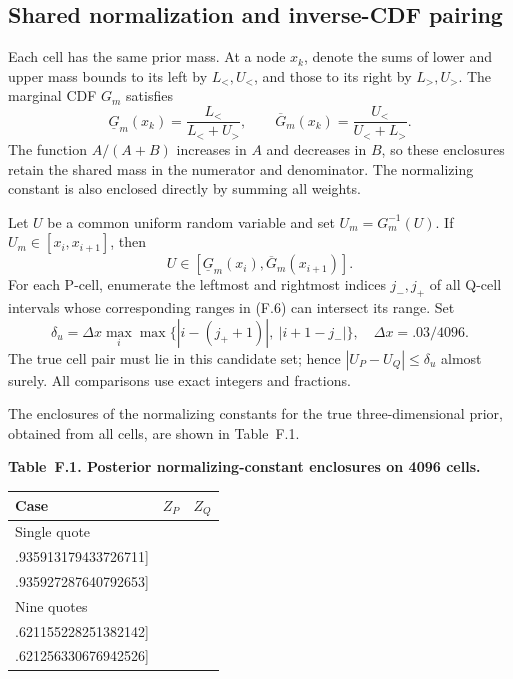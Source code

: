 \subsection{Shared normalization and inverse-CDF pairing}

Each cell has the same prior mass.
At a node \(x_k\), denote the sums of lower and upper mass bounds to its left by
\(L_<,U_<\), and those to its right by \(L_>,U_>\).
The marginal CDF \(G_m\) satisfies
\[
\underline G_m(x_k)=\frac{L_<}{L_<+U_>},
\qquad
\overline G_m(x_k)=\frac{U_<}{U_<+L_>}.
\tag{F.5}
\]
The function \(A/(A+B)\) increases in \(A\) and decreases in \(B\), so these
enclosures retain the shared mass in the numerator and denominator.
The normalizing constant is also enclosed directly by summing all weights.

Let \(U\) be a common uniform random variable and set \(U_m=G_m^{-1}(U)\).
If \(U_m\in[x_i,x_{i+1}]\), then
\[
U\in[\underline G_m(x_i),\overline G_m(x_{i+1})].
\tag{F.6}
\]
For each P-cell, enumerate the leftmost and rightmost indices \(j_-,j_+\) of all
Q-cell intervals whose corresponding ranges in (F.6) can intersect its range.
Set
\[
\delta_u=\Delta x\max_i\max\{|i-(j_++1)|,\ |i+1-j_-|\},
\quad \Delta x=.03/4096.
\tag{F.7}
\]
The true cell pair must lie in this candidate set; hence
\(|U_P-U_Q|\le\delta_u\) almost surely.
All comparisons use exact integers and fractions.

The enclosures of the normalizing constants for the true three-dimensional prior,
obtained from all cells, are shown in Table~F.1.

\noindent\textbf{Table~F.1. Posterior normalizing-constant enclosures on 4096 cells.}
\begin{center}
\begin{tabularx}{\textwidth}{@{}l X X@{}}
\toprule
Case & \(Z_P\) & \(Z_Q\) \\
\midrule
Single quote &
\(\begin{gathered}[c] [.935743002637584884,\\ .935913179433726711]\end{gathered}\) &
\(\begin{gathered}[c] [.935667223967444023,\\ .935927287640792653]\end{gathered}\) \\
\addlinespace
Nine quotes &
\(\begin{gathered}[c] [.620128921272339539,\\ .621155228251382142]\end{gathered}\) &
\(\begin{gathered}[c] [.619743550733119263,\\ .621256330676942526]\end{gathered}\) \\
\bottomrule
\end{tabularx}
\end{center}


